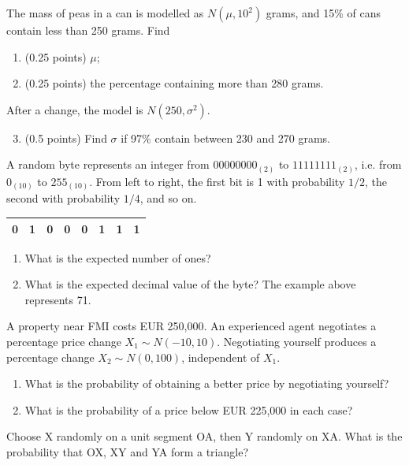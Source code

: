 \documentclass[a4paper]{report}
\begin{document}
\begin{problempencil}
The mass of peas in a can is modelled as $N(\mu,10^2)$ grams, and 15\% of cans contain less than 250 grams. Find
\begin{enumerate}
\item (0.25 points) $\mu$;
\item (0.25 points) the percentage containing more than 280 grams.
\end{enumerate}
After a change, the model is $N(250,\sigma^2)$.
\begin{enumerate}\setcounter{enumi}{2}\item (0.5 points) Find $\sigma$ if 97\% contain between 230 and 270 grams.\end{enumerate}
\end{problempencil}
\begin{problempencil}
A random byte represents an integer from $00000000_{(2)}$ to $11111111_{(2)}$, i.e. from $0_{(10)}$ to $255_{(10)}$. From left to right, the first bit is 1 with probability $1/2$, the second with probability $1/4$, and so on.
\begin{center}\begin{tabular}{|c|c|c|c|c|c|c|c|}\hline0&1&0&0&0&1&1&1\\\hline\end{tabular}\end{center}
\begin{enumerate}\item What is the expected number of ones?\item What is the expected decimal value of the byte? The example above represents 71.\end{enumerate}
\end{problempencil}
\begin{problempencil}
A property near FMI costs EUR 250,000. An experienced agent negotiates a percentage price change $X_1\sim N(-10,10)$. Negotiating yourself produces a percentage change $X_2\sim N(0,100)$, independent of $X_1$.
\begin{enumerate}
\item What is the probability of obtaining a better price by negotiating yourself?
\item What is the probability of a price below EUR 225,000 in each case?
\end{enumerate}
\end{problempencil}
\begin{problempencil}[T1, SE 2022]
Choose X randomly on a unit segment OA, then Y randomly on XA. What is the probability that OX, XY and YA form a triangle?
\end{problempencil}
\end{document}

